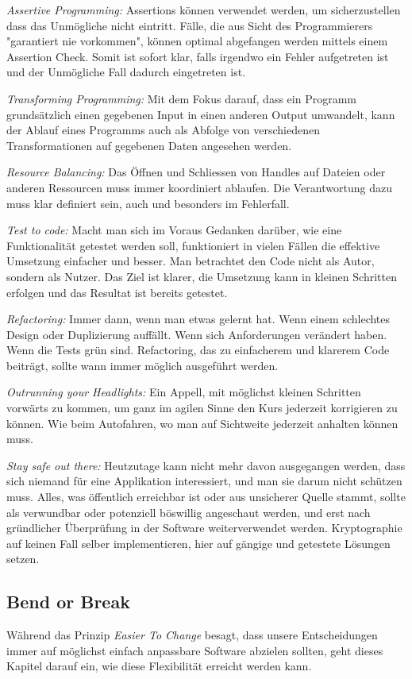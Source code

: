 \documentclass[10pt, oneside]{article}
\begin{document}
\emph{Assertive Programming: } Assertions können verwendet werden, um sicherzustellen dass das Unmögliche nicht eintritt. Fälle, die aus Sicht des Programmierers "garantiert nie vorkommen", 
können optimal abgefangen werden mittels einem Assertion Check. Somit ist sofort klar, falls irgendwo ein Fehler aufgetreten ist und der Unmögliche Fall dadurch eingetreten ist.

\emph{Transforming Programming: } Mit dem Fokus darauf, dass ein Programm grundsätzlich einen gegebenen Input in einen anderen Output umwandelt, kann der Ablauf eines 
Programms auch als Abfolge von verschiedenen Transformationen auf gegebenen Daten angesehen werden.

\emph{Resource Balancing: } Das Öffnen und Schliessen von Handles auf Dateien oder anderen Ressourcen muss immer koordiniert ablaufen. 
Die Verantwortung dazu muss klar definiert sein, auch und besonders im Fehlerfall.

\emph{Test to code: } Macht man sich im Voraus Gedanken darüber, wie eine Funktionalität getestet werden soll, funktioniert in vielen Fällen die effektive Umsetzung einfacher und besser. 
Man betrachtet den Code nicht als Autor, sondern als Nutzer. Das Ziel ist klarer, die Umsetzung kann in kleinen Schritten erfolgen und das Resultat ist bereits getestet. 

\emph{Refactoring: } Immer dann, wenn man etwas gelernt hat. Wenn einem schlechtes Design oder Duplizierung auffällt. Wenn sich Anforderungen verändert haben. Wenn die Tests grün sind. 
Refactoring, das zu einfacherem und klarerem Code beiträgt, sollte wann immer möglich ausgeführt werden. 

\emph{Outrunning your Headlights: } Ein Appell, mit möglichst kleinen Schritten vorwärts zu kommen, um ganz im agilen Sinne den Kurs jederzeit korrigieren zu können. 
Wie beim Autofahren, wo man auf Sichtweite jederzeit anhalten können muss. 

\emph{Stay safe out there: } Heutzutage kann nicht mehr davon ausgegangen werden, dass sich niemand für eine Applikation interessiert, und man sie darum nicht schützen muss. 
Alles, was öffentlich erreichbar ist oder aus unsicherer Quelle stammt, sollte als verwundbar oder potenziell böswillig angeschaut werden, und erst nach gründlicher Überprüfung
in der Software weiterverwendet werden. Kryptographie auf keinen Fall selber implementieren, hier auf gängige und getestete Lösungen setzen.

\subsection{Bend or Break}
Während das Prinzip \emph{Easier To Change} besagt, dass unsere Entscheidungen immer auf möglichst einfach anpassbare Software abzielen sollten, geht dieses Kapitel darauf ein,
wie diese Flexibilität erreicht werden kann.
\end{document}
